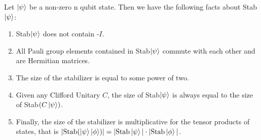 \documentclass[12pt]{dalthesis}
\begin{document}
\begin{proposition}
\label{stabilizerfacts}
Let $\ket{\psi}$ be a non-zero n qubit state. Then we have the following facts about Stab$\ket{\psi}$:
\begin{enumerate}
\item Stab$\ket{\psi}$ does not contain -$I$.
\item All Pauli group elements contained in Stab$\ket{\psi}$ commute with each other and are Hermitian matrices.
\item The size of the stabilizer is equal to some power of two.
\item Given any Clifford Unitary $C$, the size of Stab$\ket{\psi}$ is always equal to the size of Stab$(C \ket{\psi})$.
\item Finally, the size of the stabilizer is multiplicative for the tensor products of states, that is $| \text{Stab} (\ket{\psi} \ket{\phi})| = |\text{Stab}\ket{\psi}| \cdot |\text{Stab}\ket{\phi}|$. 
\end{enumerate}
\end{proposition}
\end{document}
